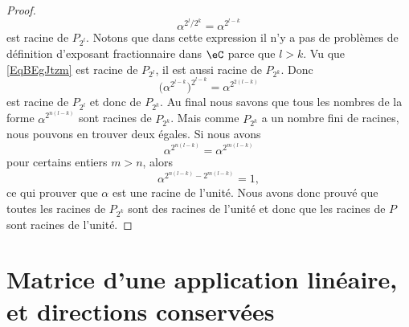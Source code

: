 \begin{proof}
    \begin{equation}    \label{EqBEgJtzm}
        \alpha^{2^l/2^k}=\alpha^{2^{l-k}}
    \end{equation}
    est racine de \( P_{2^l}\). Notons que dans cette expression il n'y a pas de problèmes de définition d'exposant fractionnaire dans \( \eC\) parce que \( l>k\). Vu que \eqref{EqBEgJtzm} est racine de \( P_{2^l}\), il est aussi racine de \( P_{2^k}\). Donc
    \begin{equation}
        \big( \alpha^{2^{l-k}} \big)^{2^{l-k}}=\alpha^{2^{2(l-k)}}
    \end{equation}
    est racine de \( P_{2^l}\) et donc de \( P_{2^k}\). Au final nous savons que tous les nombres de la forme \( \alpha^{2^{n(l-k)}}\) sont racines de \( P_{2^k}\). Mais comme \( P_{2^k}\) a un nombre fini de racines, nous pouvons en trouver deux égales. Si nous avons
    \begin{equation}
        \alpha^{2^{n(l-k)}}=\alpha^{2^{m(l-k)}}
    \end{equation}
    pour certains entiers \( m>n\), alors
    \begin{equation}
        \alpha^{2^{n(l-k)}-2^{m(l-k)}}=1,
    \end{equation}
    ce qui prouver que \( \alpha\) est une racine de l'unité. Nous avons donc prouvé que toutes les racines de \( P_{2^k}\) sont des racines de l'unité et donc que les racines de \( P\) sont racines de l'unité.
\end{proof}

\section{Matrice d'une application linéaire, et directions conservées}

